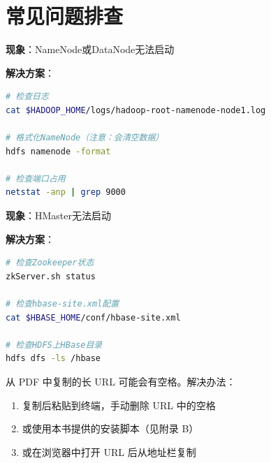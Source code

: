 \documentclass[12pt,a4paper]{article}
\begin{document}
\section{常见问题排查}

\begin{warnbox}[问题1：Hadoop启动失败]
\textbf{现象}：NameNode或DataNode无法启动

\textbf{解决方案}：
\begin{lstlisting}[language=bash]
# 检查日志
cat $HADOOP_HOME/logs/hadoop-root-namenode-node1.log

# 格式化NameNode（注意：会清空数据）
hdfs namenode -format

# 检查端口占用
netstat -anp | grep 9000
\end{lstlisting}
\end{warnbox}

\begin{warnbox}[问题2：HBase连接Zookeeper失败]
\textbf{现象}：HMaster无法启动

\textbf{解决方案}：
\begin{lstlisting}[language=bash]
# 检查Zookeeper状态
zkServer.sh status

# 检查hbase-site.xml配置
cat $HBASE_HOME/conf/hbase-site.xml

# 检查HDFS上HBase目录
hdfs dfs -ls /hbase
\end{lstlisting}
\end{warnbox}

\begin{tipbox}
从 PDF 中复制的长 URL 可能会有空格。解决办法：
\begin{enumerate}
    \item 复制后粘贴到终端，手动删除 URL 中的空格
    \item 或使用本书提供的安装脚本（见附录 B）
    \item 或在浏览器中打开 URL 后从地址栏复制
\end{enumerate}
\end{tipbox}
\end{document}
